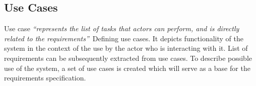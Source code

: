\subsection{Use Cases}
Use case \textit{``represents the list of tasks that actors can perform, and is directly related to the requirements''}~\cite{IBMKnowledgeCenter2019DefiningCases}Defining use cases. It depicts functionality of the system in the context of the use by the actor who is interacting with it. List of requirements can be subsequently extracted from use cases. To describe possible use of the system, a set of use cases is created which will serve as a base for the requirements specification.